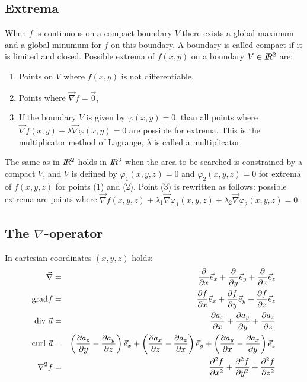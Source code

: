 \documentclass[twoside]{report}
\begin{document}
\subsection{Extrema}
When $f$ is continuous on a compact boundary $V$ there exists a global
maximum and a global minumum for $f$ on this boundary. A boundary is called
compact if it is limited and closed.
\npar
Possible extrema of $f(x,y)$ on a boundary $V\in I\hspace{-1mm}R^2$ are:
\begin{enumerate}
\item Points on $V$ where $f(x,y)$ is not differentiable,
\item Points where $\vec{\nabla}f=\vec{0}$,
\item If the boundary $V$ is given by $\varphi(x,y)=0$, than all points where
      $\vec{\nabla}f(x,y)+\lambda\vec{\nabla}\varphi(x,y)=0$ are possible
      for extrema. This is the multiplicator method of Lagrange, $\lambda$
      is called a multiplicator.
\end{enumerate}
The same as in $I\hspace{-1mm}R^2$ holds in $I\hspace{-1mm}R^3$ when the area to be searched is
constrained by a compact $V$, and $V$ is defined by $\varphi_1(x,y,z)=0$ and
$\varphi_2(x,y,z)=0$ for extrema of $f(x,y,z)$ for points (1) and (2).
Point (3) is rewritten as follows: possible extrema are points where
$\vec{\nabla}f(x,y,z)+\lambda_1\vec{\nabla}\varphi_1(x,y,z)+\lambda_2\vec{\nabla}\varphi_2(x,y,z)=0$.

\subsection{The $\nabla$-operator}
In cartesian coordinates $(x,y,z)$ holds:
\begin{eqnarray*}
\vec{\nabla}     &=&\frac{\partial }{\partial x}\vec{e}_{x}+\frac{\partial }{\partial y}\vec{e}_{y}+\frac{\partial }{\partial z}\vec{e}_{z}\\
{\rm grad}f      &=&\frac{\partial f}{\partial x}\vec{e}_{x}+\frac{\partial f}{\partial y}\vec{e}_{y}+\frac{\partial f}{\partial z}\vec{e}_{z}\\
{\rm div}~\vec{a}&=&\frac{\partial a_x}{\partial x}+\frac{\partial a_y}{\partial y}+\frac{\partial a_z}{\partial z}\\
{\rm curl}~\vec{a}&=&\left(\frac{\partial a_z}{\partial y}-\frac{\partial a_y}{\partial z}\right)\vec{e}_{x}+
                    \left(\frac{\partial a_x}{\partial z}-\frac{\partial a_z}{\partial x}\right)\vec{e}_{y}+
                    \left(\frac{\partial a_y}{\partial x}-\frac{\partial a_x}{\partial y}\right)\vec{e}_{z}\\
\nabla^2 f       &=&\frac{\partial^2 f}{\partial x^2}+\frac{\partial^2 f}{\partial y^2}+\frac{\partial^2 f}{\partial z^2}
\end{eqnarray*}
\end{document}
